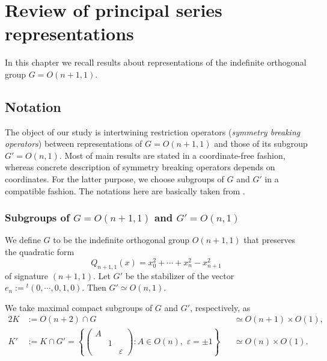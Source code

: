 \newpage
\section{Review of principal series representations}
\label{sec:ps}
In this chapter
 we recall results about representations
 of the indefinite orthogonal group 
 $G = O(n+1,1)$.  

\subsection{Notation}
\label{subsec:Xi}

The object of our study is intertwining restriction operators
 ({\it{symmetry breaking operators}})
 between representations of $G=O(n+1,1)$
 and those of its subgroup $G'=O(n,1)$.  
Most of main results are stated 
 in a coordinate-free fashion, 
 whereas concrete description of symmetry breaking operators
 depends on coordinates.  
For the latter purpose,
 we choose subgroups of $G$ and $G'$
 in a compatible fashion.  
The notations here are basically taken from \cite{sbon}.  

\subsubsection{Subgroups of $G=O(n+1,1)$
 and $G'=O(n,1)$}
\label{subsec:subgpOn}
We define $G$ to be the indefinite orthogonal group 
 $O(n+1,1)$
 that preserves the quadratic form 
\begin{equation}
\label{eqn:Qn1}
Q_{n+1,1}(x)=x_0^2+ \cdots + x_{n}^2 - x_{n+1}^2
\end{equation}
of signature $(n+1,1)$.  
Let $G'$ be the stabilizer of the vector
 $e_n:= {}^{t\!}(0, \cdots,0,1,0)$.  
Then $G' \simeq O(n,1)$.  



We take maximal compact subgroups of $G$ and $G'$, 
 respectively, 
 as 
\begin{alignat*}{2}
K 
&:= O(n+2) \cap G
&&
\simeq O(n+1) \times O(1),
\\
K'
&:= K \cap G'
=\left\{
\begin{pmatrix}
                A & & \\ & 1 & \\ & & \varepsilon
\end{pmatrix}
:
 A \in O(n),\,\, \varepsilon =\pm 1
\right\}
&&
\simeq O(n) \times O(1).  
\end{alignat*}



